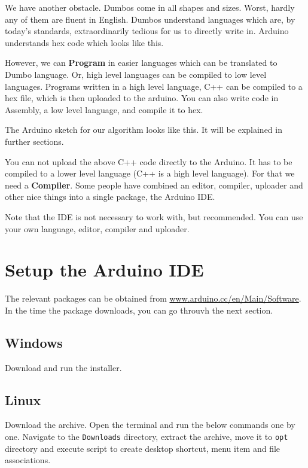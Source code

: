 \documentclass{article}
\begin{document}
	We have another obstacle. Dumbos come in all shapes and sizes. Worst, hardly any of them are fluent in English. Dumbos understand languages which are, by today's standards, extraordinarily tedious for us to directly write in. Arduino understands hex code which looks like this.

	

	However, we can \textbf{Program} in easier languages which can be translated to Dumbo language. Or, high level languages can be compiled to low level languages. Programs written in a high level language, C++ can be compiled to a hex file, which is then uploaded to the arduino. You can also write code in Assembly, a low level language, and compile it to hex.

	The Arduino sketch for our algorithm looks like this. It will be explained in further sections.

	

	You can not upload the above C++ code directly to the Arduino. It has to be compiled to a lower level language (C++ is a high level language). For that we need a \textbf{Compiler}. Some people have combined an editor, compiler, uploader and other nice things into a single package, the Arduino IDE\@.

	Note that the IDE is not necessary to work with, but recommended. You can use your own language, editor, compiler and uploader.

\section{Setup the Arduino IDE}

	The relevant packages can be obtained from \url{www.arduino.cc/en/Main/Software}. In the time the package downloads, you can go throuvh the next section.

	\subsection{Windows}
		Download and run the installer.

	\subsection{Linux}

		Download the  archive. Open the terminal and run the below commands one by one\@. Navigate to the \texttt{Downloads} directory, extract the archive, move it to \texttt{opt} directory and execute script to create desktop shortcut, menu item and file associations.
\end{document}
